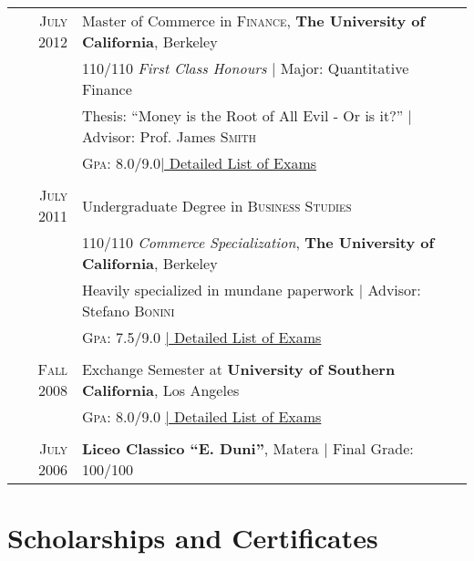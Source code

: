 \documentclass[a4paper,9pt]{article} %
\begin{document}
\begin{tabular}{rl}	
\textsc{July} 2012 & Master of Commerce in \textsc{Finance}, \textbf{The University of California}, Berkeley\\
& 110/110 \small\emph{First Class Honours} | Major: Quantitative Finance\\
& Thesis: ``Money is the Root of All Evil - Or is it?'' | \small Advisor: Prof. James \textsc{Smith}\\
&\normalsize \textsc{Gpa}: 8.0/9.0\hyperlink{grds}{\hfill | \footnotesize Detailed List of Exams}\\
&\\


\textsc{July} 2011& Undergraduate Degree in \textsc{}\textsc{Business Studies} \\&110/110 \small\emph{Commerce Specialization}, \normalsize\textbf{The University of California}, Berkeley\\
& Heavily specialized in mundane paperwork | \small Advisor: Stefano \textsc{Bonini}\\
&\normalsize \textsc{Gpa}: 7.5/9.0 \hyperlink{grds_usc}{\hfill| \footnotesize Detailed List of Exams}\\
&\\


\textsc{Fall} 2008 & Exchange Semester at \textbf{University of Southern California}, Los Angeles\\
& \textsc{Gpa}: 8.0/9.0 \hyperlink{grds_usc}{\hfill| \footnotesize Detailed List of Exams}\\
&\\


\textsc{July} 2006& \textbf{Liceo Classico ``E. Duni''}, Matera | Final Grade: 100/100
\end{tabular}


\section{Scholarships and Certificates}
\end{document}
